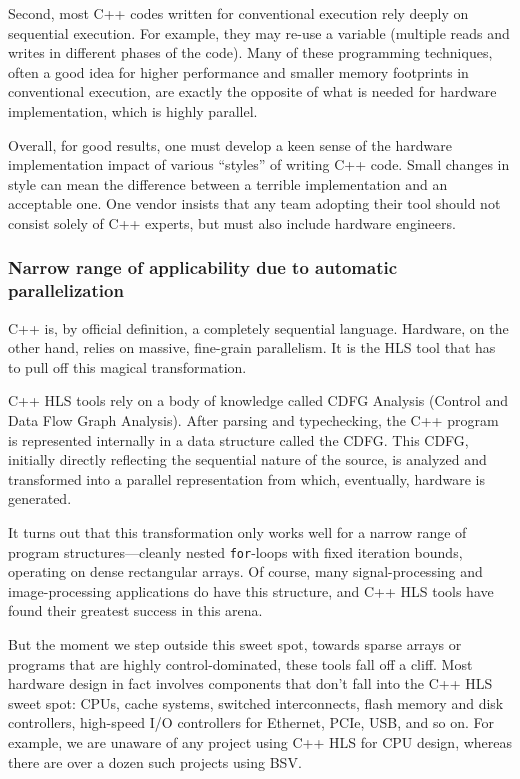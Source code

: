 Second, most C++ codes written for conventional execution rely deeply
on sequential execution.  For example, they may re-use a variable
(multiple reads and writes in different phases of the code).  Many of
these programming techniques, often a good idea for higher performance
and smaller memory footprints in conventional execution, are exactly
the opposite of what is needed for hardware implementation, which is
highly parallel.

Overall, for good results, one must develop a keen sense of the
hardware implementation impact of various ``styles'' of writing C++
code.  Small changes in style can mean the difference between a
terrible implementation and an acceptable one.  One vendor insists
that any team adopting their tool should not consist solely of C++
experts, but must also include hardware engineers.


\subsubsection{Narrow range of applicability due to automatic parallelization}

C++ is, by official definition, a completely sequential language.
Hardware, on the other hand, relies on massive, fine-grain
parallelism.  It is the HLS tool that has to pull off this magical
transformation.

C++ HLS tools rely on a body of knowledge called CDFG Analysis
(Control and Data Flow Graph Analysis).  After parsing and
typechecking, the C++ program is represented internally in a data
structure called the CDFG. This CDFG, initially directly reflecting
the sequential nature of the source, is analyzed and transformed into
a parallel representation from which, eventually, hardware is
generated.

It turns out that this transformation only works well for a narrow
range of program structures---cleanly nested \verb|for|-loops with
fixed iteration bounds, operating on dense rectangular arrays.  Of
course, many signal-processing and image-processing applications do
have this structure, and C++ HLS tools have found their greatest
success in this arena.

But the moment we step outside this sweet spot, towards sparse arrays
or programs that are highly control-dominated, these tools fall off a
cliff.  Most hardware design in fact involves components that don't
fall into the C++ HLS sweet spot: CPUs, cache systems, switched
interconnects, flash memory and disk controllers, high-speed I/O
controllers for Ethernet, PCIe, USB, and so on.  For example, we are
unaware of any project using C++ HLS for CPU design, whereas there are
over a dozen such projects using BSV.

